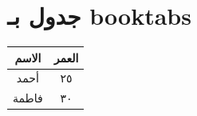 ﻿\documentclass{article}
\begin{document}
\section{جدول بـ booktabs}
\begin{tabular}{cc}
\toprule
الاسم & العمر \\
\midrule
أحمد & ٢٥ \\
فاطمة & ٣٠ \\
\bottomrule
\end{tabular}
\end{document}
